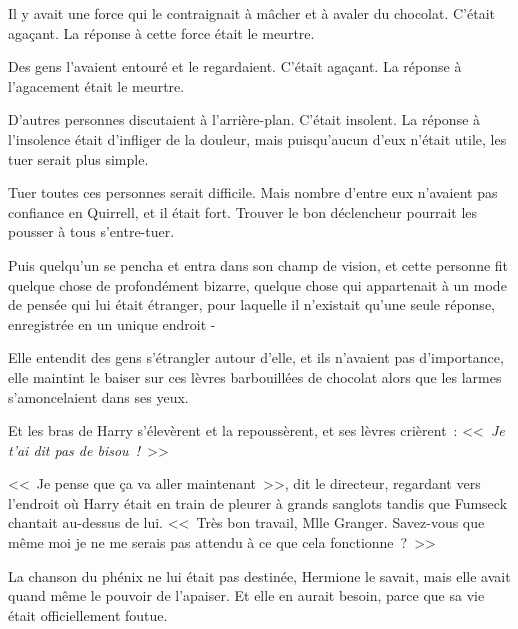 \later

Il y avait une force qui le contraignait à mâcher et à avaler du chocolat. C'était agaçant. La réponse à cette force était le meurtre.

Des gens l'avaient entouré et le regardaient. C'était agaçant. La réponse à l'agacement était le meurtre.

D'autres personnes discutaient à l'arrière-plan. C'était insolent. La réponse à l'insolence était d'infliger de la douleur, mais puisqu'aucun d'eux n'était utile, les tuer serait plus simple.

Tuer toutes ces personnes serait difficile. Mais nombre d'entre eux n'avaient pas confiance en Quirrell, et il était fort. Trouver le bon déclencheur pourrait les pousser à tous s'entre-tuer.

Puis quelqu'un se pencha et entra dans son champ de vision, et cette personne fit quelque chose de profondément bizarre, quelque chose qui appartenait à un mode de pensée qui lui était étranger, pour laquelle il n'existait qu'une seule réponse, enregistrée en un unique endroit -

\later

Elle entendit des gens s'étrangler autour d'elle, et ils n'avaient pas d'importance, elle maintint le baiser sur ces lèvres barbouillées de chocolat alors que les larmes s'amoncelaient dans ses yeux.

Et les bras de Harry s'élevèrent et la repoussèrent, et ses lèvres crièrent~: <<~\emph{Je t'ai dit pas de bisou~!}~>>

\later

<<~Je pense que ça va aller maintenant~>>, dit le directeur, regardant vers l'endroit où Harry était en train de pleurer à grands sanglots tandis que Fumseck chantait au-dessus de lui. <<~Très bon travail, Mlle Granger. Savez-vous que même moi je ne me serais pas attendu à ce que cela fonctionne~?~>>

La chanson du phénix ne lui était pas destinée, Hermione le savait, mais elle avait quand même le pouvoir de l'apaiser. Et elle en aurait besoin, parce que sa vie était officiellement foutue.
